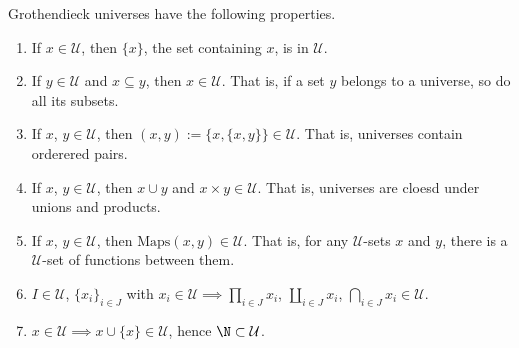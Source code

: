 \documentclass[main.tex]{subfiles}
\begin{document}
\begin{lemma}
  \label{lemma:properties_of_universes}
  Grothendieck universes have the following properties.
  \begin{enumerate}
    \item If $x \in \mathcal{U}$, then $\{x\}$, the set containing $x$, is in $\mathcal{U}$.

    \item If $y \in \mathcal{U}$ and $x \subseteq y$, then $x \in \mathcal{U}$. That is, if a set $y$ belongs to a universe, so do all its subsets.

    \item If $x$, $y \in \mathcal{U}$, then $(x, y) := \{x, \{x, y\}\} \in \mathcal{U}$. That is, universes contain orderered pairs.

    \item If $x$, $y \in \mathcal{U}$, then $x \cup y$ and $x \times y \in \mathcal{U}$. That is, universes are cloesd under unions and products.

    \item If $x$, $y \in \mathcal{U}$, then $\mathrm{Maps}(x, y) \in \mathcal{U}$. That is, for any $\mathcal{U}$-sets $x$ and $y$, there is a $\mathcal{U}$-set of functions between them.

    \item $I \in \mathcal{U}$, $\{x_{i}\}_{i \in J}$ with $x_{i} \in \mathcal{U} \implies \prod_{i \in J} x_{i}$, $\coprod_{i \in J} x_{i}$, $\bigcap_{i \in J} x_{i} \in \mathcal{U}$.

    \item $x \in \mathcal{U} \implies x \cup \{x\} \in \mathcal{U}$, hence $\N \subset \mathcal{U}$.
  \end{enumerate}
\end{lemma}
\end{document}
